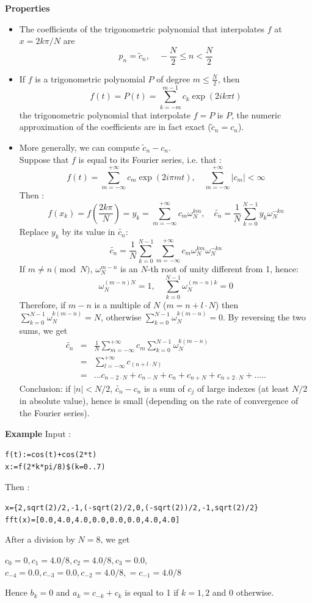 \documentclass[a4paper,11pt]{book}
\begin{document}
\begin{enumerate}
{\bf Properties}
\begin{itemize}
\item The coefficients of the trigonometric polynomial that interpolates $f$ 
at $x=2k\pi/N$ are
\[ p_n=\tilde{c}_n, \quad -\frac{N}{2} \leq n<\frac{N}{2} \]
\item
If $f$ is a trigonometric polynomial $P$ of degree $m\leq \frac{N}{2}$, 
then
\[ f(t)=P(t)=\sum_{k=-m}^{m-1}c_k\exp(2ik\pi t) \]
the trigonometric polynomial that interpolate $f=P$ is $P$, the numeric 
approximation of the coefficients are in fact exact ($\tilde{c}_n=c_n$).
\item More generally, we can compute $\tilde{c}_n-c_n$.\\
Suppose that $f$ is equal to its Fourier series, i.e. that :\\
\[ f(t)=\sum_{m=-\infty}^{+\infty}c_m\exp(2i\pi mt), \quad
\sum_{m=-\infty}^{+\infty}|c_m|<\infty \]
Then :
\[ f(x_k)=f(\frac{2k\pi}{N})=y_k=\sum_{m=-\infty}^{+\infty}c_m\omega_N^{km},
\quad
\tilde{c_n}=\frac{1}{N}\sum_{k=0}^{N-1}y_k\omega_N^{-kn} \]
Replace $y_k$ by its value in $\tilde{c_n}$:
\[
\tilde{c_n}=\frac{1}{N}\sum_{k=0}^{N-1}\sum_{m=-\infty}^{+\infty}
c_m\omega_N^{km}\omega_N^{-kn} \]
If $m\neq n \pmod N$, $\omega_N^{m-n}$ is an $N$-th root of unity different
from 1, hence:
\[ \omega_N^{(m-n)N}=1, \quad \sum_{k=0}^{N-1}\omega_N^{(m-n)k}=0 \]
Therefore, if $m-n$ is a multiple of $N$ ($m=n+l\cdot N$) then 
$\sum_{k=0}^{N-1}\omega_N^{k(m-n)}=N$, otherwise 
$\sum_{k=0}^{N-1}\omega_N^{k(m-n)}=0$.
By reversing the two sums, we get
\begin{eqnarray*}
\tilde{c_n}&=&\frac{1}{N}\sum_{m=-\infty}^{+\infty}c_m\sum_{k=0}^{N-1}\omega_N^{k(m-n)} \\
&=&\sum_{l=-\infty}^{+\infty}c_{(n+l\cdot N)} \\
&=&...c_{n-2\cdot N}+c_{n-N}+c_{n}+c_{n+N}+c_{n+2\cdot
  N}+.....
\end{eqnarray*}
Conclusion: if $|n|<N/2$, $\tilde{c_n}-c_n$ is a sum of $c_j$ of large indexes 
(at least $N/2$ in absolute value), hence is small (depending on the
rate of convergence of the Fourier series).
\end{itemize}
{\bf Example}
Input :\\
\begin{center}
{\tt f(t):=cos(t)+cos(2*t)}\\
{\tt x:=f(2*k*pi/8)\$(k=0..7)}\\
\end{center}
Then :
\begin{center}
 {\tt x=\{2,sqrt(2)/2,-1,(-sqrt(2)/2,0,(-sqrt(2))/2,-1,sqrt(2)/2\} }\\
{\tt fft(x)=[0.0,4.0,4.0,0.0,0.0,0.0,4.0,4.0]}
\end{center}
After a division by $N=8$, we get
\begin{center} $c_0=0,c_1=4.0/8,c_2=4.0/8,c_3=0.0$,\\
$c_{-4}=0.0,c_{-3}=0.0,c_{-2}=4.0/8,=c_{-1}=4.0/8$
\end{center}
Hence $b_k=0$ and  $a_k=c_{-k}+c_k$ is equal to 1 if $k=1,2$ and 0 otherwise. 


\end{enumerate}
\end{document}
